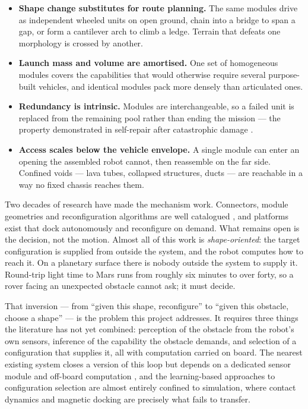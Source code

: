 \documentclass[11pt,a4paper]{article}
\begin{document}
{\begin{itemize}
  \item \textbf{Shape change substitutes for route planning.} The same modules
        drive as independent wheeled units on open ground, chain into a bridge
        to span a gap, or form a cantilever arch to climb a ledge. Terrain that
        defeats one morphology is crossed by another.
  \item \textbf{Launch mass and volume are amortised.} One set of homogeneous
        modules covers the capabilities that would otherwise require several
        purpose-built vehicles, and identical modules pack more densely than
        articulated ones.
  \item \textbf{Redundancy is intrinsic.} Modules are interchangeable, so a
        failed unit is replaced from the remaining pool rather than ending the
        mission --- the property demonstrated in self-repair after
        catastrophic damage \cite{yim2007ckbot}.
  \item \textbf{Access scales below the vehicle envelope.} A single module can
        enter an opening the assembled robot cannot, then reassemble on the far
        side. Confined voids --- lava tubes, collapsed structures, ducts ---
        are reachable in a way no fixed chassis reaches them.
\end{itemize}

Two decades of research have made the mechanism work. Connectors, module
geometries and reconfiguration algorithms are well catalogued
\cite{liang2025,dai2024}, and platforms exist that dock autonomously and
reconfigure on demand. What remains open is the decision, not the motion.
Almost all of this work is \emph{shape-oriented}: the target configuration is
supplied from outside the system, and the robot computes how to reach it. On a
planetary surface there is nobody outside the system to supply it. Round-trip
light time to Mars runs from roughly six minutes to over forty, so a rover
facing an unexpected obstacle cannot ask; it must decide.

That inversion --- from ``given this shape, reconfigure'' to ``given this
obstacle, choose a shape'' --- is the problem this project addresses. It
requires three things the literature has not yet combined: perception of the
obstacle from the robot's own sensors, inference of the capability the obstacle
demands, and selection of a configuration that supplies it, all with
computation carried on board. The nearest existing system closes a version of
this loop but depends on a dedicated sensor module and off-board computation
\cite{daudelin2018}, and the learning-based approaches to configuration
selection are almost entirely confined to simulation, where contact dynamics
and magnetic docking are precisely what fails to transfer.

}
\end{document}
